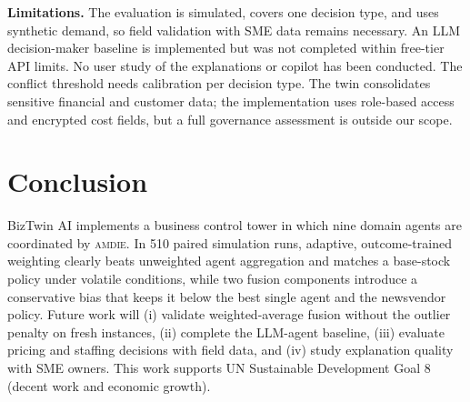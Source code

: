 \documentclass[conference]{IEEEtran}
\newcommand{\amdie}{\textsc{amdie}}
\begin{document}
\textbf{Limitations.} The evaluation is simulated, covers one decision type, and uses synthetic demand, so field validation with SME data remains necessary. An LLM decision-maker baseline is implemented but was not completed within free-tier API limits. No user study of the explanations or copilot has been conducted. The conflict threshold needs calibration per decision type. The twin consolidates sensitive financial and customer data; the implementation uses role-based access and encrypted cost fields, but a full governance assessment is outside our scope.

\section{Conclusion}
BizTwin AI implements a business control tower in which nine domain agents are coordinated by \amdie{}. In 510 paired simulation runs, adaptive, outcome-trained weighting clearly beats unweighted agent aggregation and matches a base-stock policy under volatile conditions, while two fusion components introduce a conservative bias that keeps it below the best single agent and the newsvendor policy. Future work will (i) validate weighted-average fusion without the outlier penalty on fresh instances, (ii) complete the LLM-agent baseline, (iii) evaluate pricing and staffing decisions with field data, and (iv) study explanation quality with SME owners. This work supports UN Sustainable Development Goal 8 (decent work and economic growth).



\end{document}
